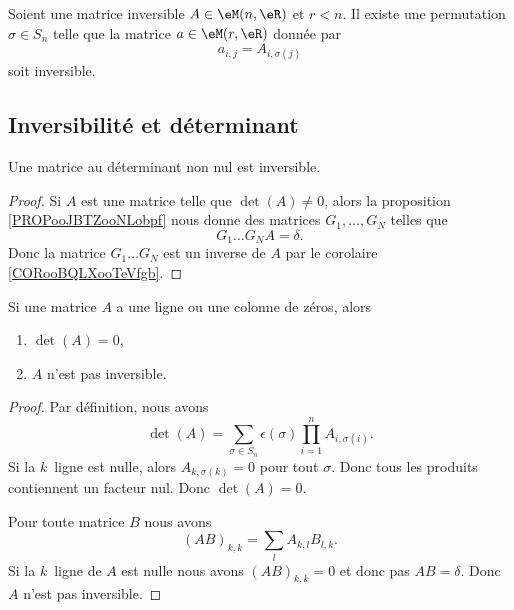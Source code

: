\begin{lemma}        \label{LEMooMCIDooYBHrbq}
	Soient une matrice inversible \( A\in \eM(n,\eR)\) et \( r<n\). Il existe une permutation \( \sigma\in S_n\) telle que la matrice \( a\in\eM(r,\eR)\) donnée par
	\begin{equation}
		a_{i,j}=A_{i,\sigma(j)}
	\end{equation}
	soit inversible.
\end{lemma}

\subsection{Inversibilité et déterminant}

\begin{proposition}     \label{PROPooAVIXooMtVCet}
	Une matrice au déterminant non nul est inversible.
\end{proposition}

\begin{proof}
	Si \( A\) est une matrice telle que \( \det(A)\neq 0\), alors la proposition \ref{PROPooJBTZooNLobpf} nous donne des matrices \( G_1,\ldots, G_N\) telles que
	\begin{equation}
		G_1\ldots G_NA=\delta.
	\end{equation}
	Donc la matrice \( G_1\ldots G_N\) est un inverse de \( A\) par le corolaire \ref{CORooBQLXooTeVfgb}.
\end{proof}

\begin{proposition}     \label{PROPooEOKBooKUROFg}
	Si une matrice \( A\) a une ligne ou une colonne de zéros, alors
	\begin{enumerate}
		\item
		      \( \det(A)=0\),
		\item
		      \( A\) n'est pas inversible.
	\end{enumerate}
\end{proposition}

\begin{proof}
	Par définition, nous avons
	\begin{equation}
		\det(A)=\sum_{\sigma\in S_n}\epsilon(\sigma)\prod_{i=1}^n A_{i,\sigma(i)}.
	\end{equation}
	Si la \( k\)\ieme\ ligne est nulle, alors \( A_{k,\sigma(k)}=0\) pour tout \( \sigma\). Donc tous les produits contiennent un facteur nul. Donc \( \det(A)=0\).

	Pour toute matrice \( B\) nous avons
	\begin{equation}
		(AB)_{k,k}=\sum_l A_{k,l}B_{l,k}.
	\end{equation}
	Si la \( k\)\ieme\ ligne de \( A\) est nulle nous avons \( (AB)_{k,k}=0\) et donc pas \( AB=\delta\). Donc \( A\) n'est pas inversible.
\end{proof}

